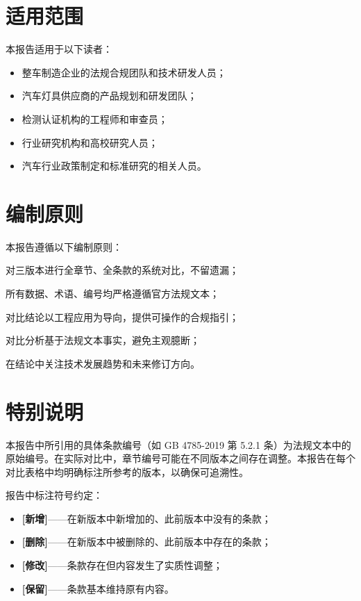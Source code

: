\section*{适用范围}

本报告适用于以下读者：
\begin{itemize}[leftmargin=2em]
    \item 整车制造企业的法规合规团队和技术研发人员；
    \item 汽车灯具供应商的产品规划和研发团队；
    \item 检测认证机构的工程师和审查员；
    \item 行业研究机构和高校研究人员；
    \item 汽车行业政策制定和标准研究的相关人员。
\end{itemize}

\section*{编制原则}

本报告遵循以下编制原则：

\begin{description}[leftmargin=2em, style=nextline]
    \item[系统性]  对三版本进行全章节、全条款的系统对比，不留遗漏；
    \item[准确性]  所有数据、术语、编号均严格遵循官方法规文本；
    \item[实用性]  对比结论以工程应用为导向，提供可操作的合规指引；
    \item[客观性]  对比分析基于法规文本事实，避免主观臆断；
    \item[前瞻性]  在结论中关注技术发展趋势和未来修订方向。
\end{description}

\section*{特别说明}

本报告中所引用的具体条款编号（如 GB 4785-2019 第 5.2.1 条）为法规文本中的原始编号。在实际对比中，章节编号可能在不同版本之间存在调整。本报告在每个对比表格中均明确标注所参考的版本，以确保可追溯性。

报告中标注符号约定：
\begin{itemize}[leftmargin=2em]
    \item \textcolor{themegreen}{\textbf{[新增]}}——在新版本中新增加的、此前版本中没有的条款；
    \item \textcolor{themered}{\textbf{[删除]}}——在新版本中被删除的、此前版本中存在的条款；
    \item \textcolor{themeorange}{\textbf{[修改]}}——条款存在但内容发生了实质性调整；
    \item \textcolor{themeblue}{\textbf{[保留]}}——条款基本维持原有内容。
\end{itemize}

